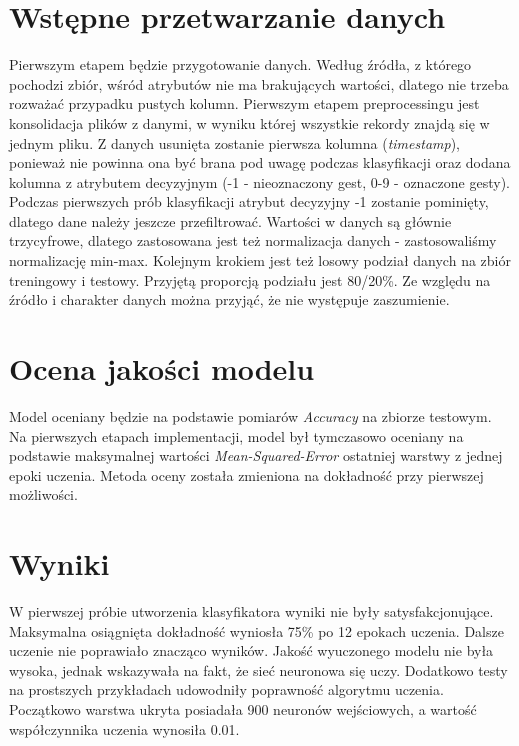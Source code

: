 \documentclass[a4paper,12pt]{article}
\begin{document}
\section{Wstępne przetwarzanie danych}
\hspace{1cm}Pierwszym etapem będzie przygotowanie danych. Według źródła, z którego pochodzi zbiór, wśród atrybutów nie ma brakujących wartości, dlatego nie trzeba rozważać przypadku pustych kolumn. Pierwszym etapem preprocessingu jest konsolidacja plików z danymi, w wyniku której wszystkie rekordy znajdą się w jednym pliku. Z danych usunięta zostanie pierwsza kolumna (\textsl{timestamp}), ponieważ nie powinna ona być brana pod uwagę podczas klasyfikacji oraz dodana kolumna z atrybutem decyzyjnym (-1 - nieoznaczony gest, 0-9 - oznaczone gesty). Podczas pierwszych prób klasyfikacji atrybut decyzyjny -1 zostanie pominięty, dlatego dane należy jeszcze przefiltrować. Wartości w danych są głównie trzycyfrowe, dlatego zastosowana jest też normalizacja danych - zastosowaliśmy normalizację min-max. Kolejnym krokiem jest też losowy podział danych na zbiór treningowy i testowy. Przyjętą proporcją podziału jest 80/20\%. Ze względu na źródło i charakter danych można przyjąć, że nie występuje zaszumienie.

\section{Ocena jakości modelu}
\hspace{1cm}Model oceniany będzie na podstawie pomiarów \textsl{Accuracy} na zbiorze testowym. Na pierwszych etapach implementacji, model był tymczasowo oceniany na podstawie maksymalnej wartości \textsl{Mean-Squared-Error} ostatniej warstwy z jednej epoki uczenia. Metoda oceny została zmieniona na dokładność przy pierwszej możliwości.

\section{Wyniki}
\hspace{1cm}W pierwszej próbie utworzenia klasyfikatora wyniki nie były satysfakcjonujące. Maksymalna osiągnięta dokładność wyniosła 75\% po 12 epokach uczenia. Dalsze uczenie nie poprawiało znacząco wyników. Jakość wyuczonego modelu nie była wysoka, jednak wskazywała na fakt, że sieć neuronowa się uczy. Dodatkowo testy na prostszych przykładach udowodniły poprawność algorytmu uczenia. Początkowo warstwa ukryta posiadała 900 neuronów wejściowych, a wartość współczynnika uczenia wynosiła 0.01.
\end{document}
